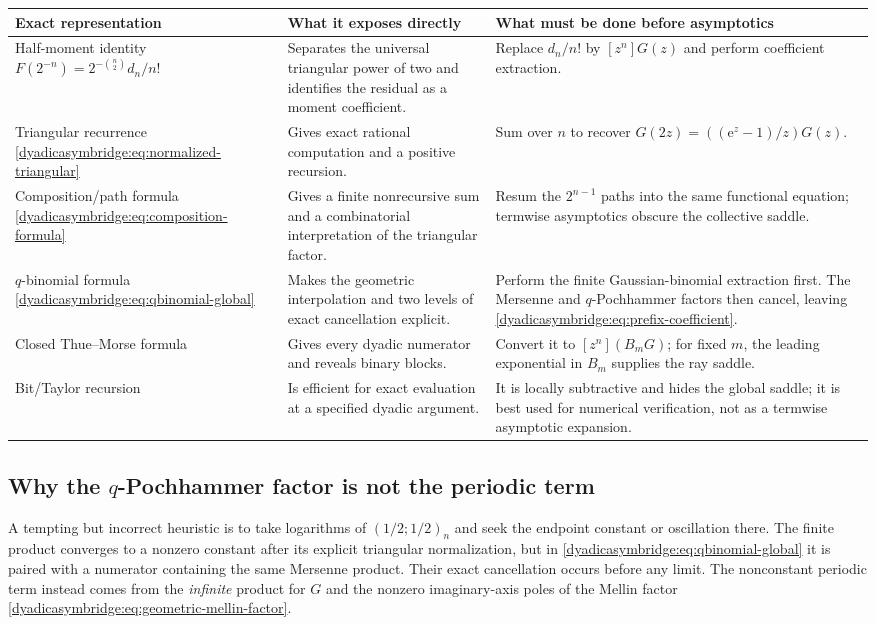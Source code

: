 \documentclass[11pt,oneside]{article}
\theoremstyle{definition}
\theoremstyle{remark}
\newcommand{\e}{\mathrm e}
\begin{document}
\begingroup\small
\begin{longtable}{@{}
>{\raggedright\arraybackslash}p{}
>{\raggedright\arraybackslash}p{}
>{\raggedright\arraybackslash}p{}@{}}
\toprule
Exact representation & What it exposes directly & What must be done before asymptotics\\
\midrule
\endhead
Half-moment identity
$F(2^{-n})=2^{-\binom n2}d_n/n!$
& Separates the universal triangular power of two and identifies the residual as a moment coefficient.
& Replace $d_n/n!$ by $[z^n]G(z)$ and perform coefficient extraction.\\[0.6em]
Triangular recurrence
\eqref{dyadicasymbridge:eq:normalized-triangular}
& Gives exact rational computation and a positive recursion.
& Sum over $n$ to recover $G(2z)=((\e^z-1)/z)G(z)$.\\[0.6em]
Composition/path formula
\eqref{dyadicasymbridge:eq:composition-formula}
& Gives a finite nonrecursive sum and a combinatorial interpretation of the triangular factor.
& Resum the $2^{n-1}$ paths into the same functional equation; termwise asymptotics obscure the collective saddle.\\[0.6em]
$q$-binomial formula
\eqref{dyadicasymbridge:eq:qbinomial-global}
& Makes the geometric interpolation and two levels of exact cancellation explicit.
& Perform the finite Gaussian-binomial extraction first.  The Mersenne and $q$-Pochhammer factors then cancel, leaving \eqref{dyadicasymbridge:eq:prefix-coefficient}.\\[0.6em]
Closed Thue--Morse formula
& Gives every dyadic numerator and reveals binary blocks.
& Convert it to $[z^n](B_mG)$; for fixed $m$, the leading exponential in $B_m$ supplies the ray saddle.\\[0.6em]
Bit/Taylor recursion
& Is efficient for exact evaluation at a specified dyadic argument.
& It is locally subtractive and hides the global saddle; it is best used for numerical verification, not as a termwise asymptotic expansion.\\
\bottomrule
\end{longtable}
\endgroup

\subsection{Why the \texorpdfstring{$q$}{q}-Pochhammer factor is not the periodic term}

A tempting but incorrect heuristic is to take logarithms of
$(1/2;1/2)_n$ and seek the endpoint constant or oscillation there.  The finite product converges to a nonzero constant after its explicit triangular normalization, but in
\eqref{dyadicasymbridge:eq:qbinomial-global} it is paired with a numerator containing the same Mersenne product.  Their exact cancellation occurs before any limit.  The nonconstant periodic term instead comes from the \emph{infinite} product for $G$ and the nonzero imaginary-axis poles of the Mellin factor \eqref{dyadicasymbridge:eq:geometric-mellin-factor}.
\end{document}
